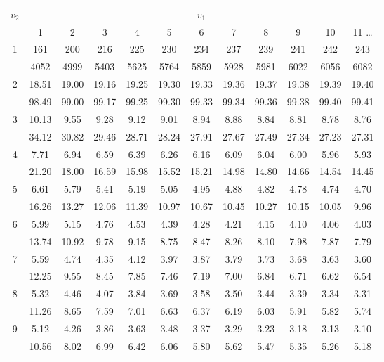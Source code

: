 \documentclass[lang=cn,10pt]{elegantbook}
\begin{document}
\begin{longtable}{c|ccccccccccc}
    \hline
    $v_2$ & \multicolumn{11}{c}{$v_1$} \\
    & 1 & 2 & 3 & 4 & 5 & 6 & 7 & 8 & 9 & 10 & 11 \dots \\
    \hline
    \endhead
    1 & 161 & 200 & 216 & 225 & 230 & 234 & 237 & 239 & 241 & 242 & 243 \\
      & 4052 & 4999 & 5403 & 5625 & 5764 & 5859 & 5928 & 5981 & 6022 & 6056 & 6082 \\
    2 & 18.51 & 19.00 & 19.16 & 19.25 & 19.30 & 19.33 & 19.36 & 19.37 & 19.38 & 19.39 & 19.40 \\
      & 98.49 & 99.00 & 99.17 & 99.25 & 99.30 & 99.33 & 99.34 & 99.36 & 99.38 & 99.40 & 99.41 \\
    3 & 10.13 & 9.55 & 9.28 & 9.12 & 9.01 & 8.94 & 8.88 & 8.84 & 8.81 & 8.78 & 8.76 \\
      & 34.12 & 30.82 & 29.46 & 28.71 & 28.24 & 27.91 & 27.67 & 27.49 & 27.34 & 27.23 & 27.31 \\
    4 & 7.71 & 6.94 & 6.59 & 6.39 & 6.26 & 6.16 & 6.09 & 6.04 & 6.00 & 5.96 & 5.93 \\
      & 21.20 & 18.00 & 16.59 & 15.98 & 15.52 & 15.21 & 14.98 & 14.80 & 14.66 & 14.54 & 14.45 \\
    5 & 6.61 & 5.79 & 5.41 & 5.19 & 5.05 & 4.95 & 4.88 & 4.82 & 4.78 & 4.74 & 4.70 \\
      & 16.26 & 13.27 & 12.06 & 11.39 & 10.97 & 10.67 & 10.45 & 10.27 & 10.15 & 10.05 & 9.96 \\
    6 & 5.99 & 5.15 & 4.76 & 4.53 & 4.39 & 4.28 & 4.21 & 4.15 & 4.10 & 4.06 & 4.03 \\
      & 13.74 & 10.92 & 9.78 & 9.15 & 8.75 & 8.47 & 8.26 & 8.10 & 7.98 & 7.87 & 7.79 \\
    7 & 5.59 & 4.74 & 4.35 & 4.12 & 3.97 & 3.87 & 3.79 & 3.73 & 3.68 & 3.63 & 3.60 \\
      & 12.25 & 9.55 & 8.45 & 7.85 & 7.46 & 7.19 & 7.00 & 6.84 & 6.71 & 6.62 & 6.54 \\
    8 & 5.32 & 4.46 & 4.07 & 3.84 & 3.69 & 3.58 & 3.50 & 3.44 & 3.39 & 3.34 & 3.31 \\
      & 11.26 & 8.65 & 7.59 & 7.01 & 6.63 & 6.37 & 6.19 & 6.03 & 5.91 & 5.82 & 5.74 \\
    9 & 5.12 & 4.26 & 3.86 & 3.63 & 3.48 & 3.37 & 3.29 & 3.23 & 3.18 & 3.13 & 3.10 \\
      & 10.56 & 8.02 & 6.99 & 6.42 & 6.06 & 5.80 & 5.62 & 5.47 & 5.35 & 5.26 & 5.18 \\

\end{longtable}
\end{document}
